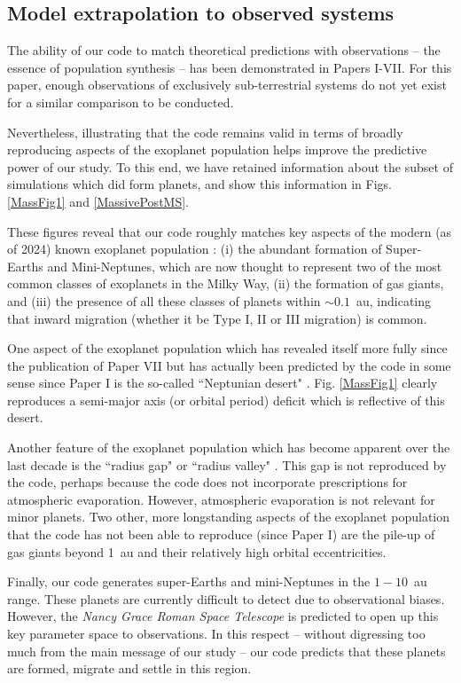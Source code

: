 \documentclass[useAMS,usenatbib]{mn2e}
\newcommand{\rev}{ }
\begin{document}
{\rev
\subsection{Model extrapolation to observed systems}

The ability of our code to match theoretical predictions with observations -- the essence of population synthesis -- has been demonstrated in Papers I-VII. For this paper, enough observations of exclusively sub-terrestrial systems do not yet exist for a similar comparison to be conducted. 

Nevertheless, illustrating that the code remains valid in terms of broadly reproducing aspects of the exoplanet population helps improve the predictive power of our study. To this end, we have retained information about the subset of simulations which did form planets, and show this information in Figs. \ref{MassFig1} and \ref{MassivePostMS}.

These figures reveal that our code roughly matches key aspects of the modern (as of 2024) known exoplanet population \citep{cloutier2024}: (i) the abundant formation of Super-Earths and Mini-Neptunes, which are now thought to represent two of the most common classes of exoplanets in the Milky Way, (ii) the formation of gas giants, and (iii) the presence of all these classes of planets within $\sim 0.1$~au, indicating that inward migration (whether it be Type I, II or III migration) is common. 

One aspect of the exoplanet population which has revealed itself more fully since the publication of Paper VII but has actually been predicted by the code in some sense since Paper I is the so-called ``Neptunian desert" \citep[e.g.][]{fraetal2023,guietal2023,hawetal2023,osbetal2023,feretal2024,nabetal2024}. Fig. \ref{MassFig1} clearly reproduces a semi-major axis (or orbital period) deficit which is reflective of this desert. 

Another feature of the exoplanet population which has become apparent over the last decade is the ``radius gap" or ``radius valley" \citep[e.g.][]{fulpet2018,petetal2022}. This gap is not reproduced by the code, perhaps because the code does not incorporate prescriptions for atmospheric evaporation. However, atmospheric evaporation is not relevant for minor planets. Two other, more longstanding aspects of the exoplanet population that the code has not been able to reproduce (since Paper I) are the pile-up of gas giants beyond 1~au and their relatively high orbital eccentricities.

Finally, our code generates super-Earths and mini-Neptunes in the $1-10$~au range. These planets are currently difficult to detect due to observational biases. However, the {\it Nancy Grace Roman Space Telescope} is predicted to open up this key parameter space to observations. In this respect -- without digressing too much from the main message of our study -- our code predicts that these planets are formed, migrate and settle in this region.
}
\end{document}
